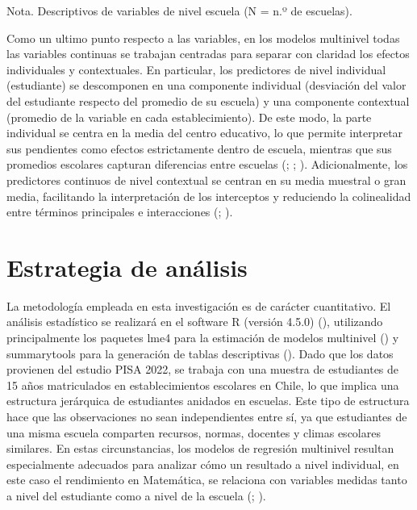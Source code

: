 \documentclass[
  spanish,
  a4paper,
  oneside]{scrbook}
\begin{document}
Nota. Descriptivos de variables de nivel escuela (N = n.º de escuelas).

\endgroup

Como un ultimo punto respecto a las variables, en los modelos multinivel
todas las variables continuas se trabajan centradas para separar con
claridad los efectos individuales y contextuales. En particular, los
predictores de nivel individual (estudiante) se descomponen en una
componente individual (desviación del valor del estudiante respecto del
promedio de su escuela) y una componente contextual (promedio de la
variable en cada establecimiento). De este modo, la parte individual se
centra en la media del centro educativo, lo que permite interpretar sus
pendientes como efectos estrictamente dentro de escuela, mientras que
sus promedios escolares capturan diferencias entre escuelas
(;
;
).
Adicionalmente, los predictores continuos de nivel contextual se centran
en su media muestral o gran media, facilitando la interpretación de los
interceptos y reduciendo la colinealidad entre términos principales e
interacciones (;
).

\section{Estrategia de análisis}\label{estrategia-de-anuxe1lisis}

La metodología empleada en esta investigación es de carácter
cuantitativo. El análisis estadístico se realizará en el software R
(versión 4.5.0) (),
utilizando principalmente los paquetes lme4 para la estimación de
modelos multinivel () y
summarytools para la generación de tablas descriptivas
(). Dado que los datos
provienen del estudio PISA 2022, se trabaja con una muestra de
estudiantes de 15 años matriculados en establecimientos escolares en
Chile, lo que implica una estructura jerárquica de estudiantes anidados
en escuelas. Este tipo de estructura hace que las observaciones no sean
independientes entre sí, ya que estudiantes de una misma escuela
comparten recursos, normas, docentes y climas escolares similares. En
estas circunstancias, los modelos de regresión multinivel resultan
especialmente adecuados para analizar cómo un resultado a nivel
individual, en este caso el rendimiento en Matemática, se relaciona con
variables medidas tanto a nivel del estudiante como a nivel de la
escuela (;
).
\end{document}
